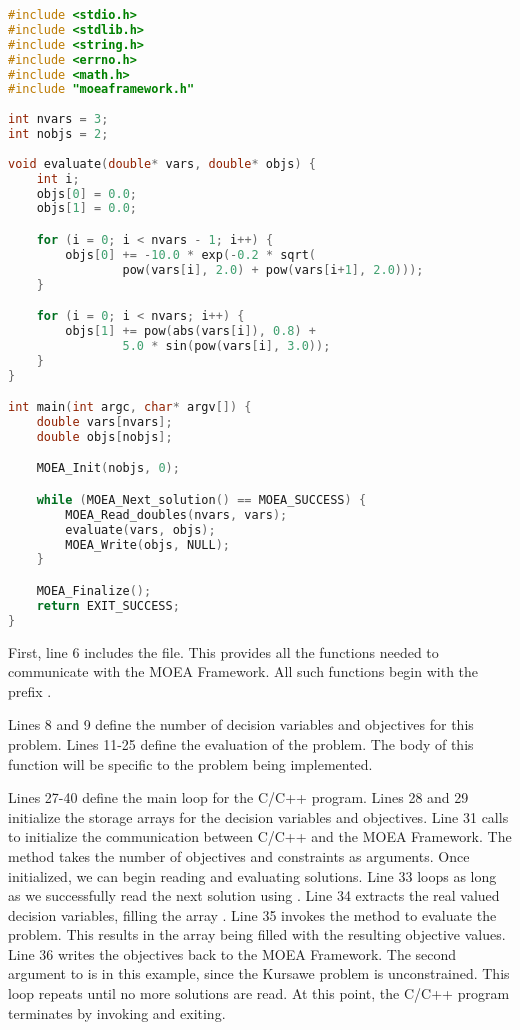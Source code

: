 \begin{lstlisting}[language=C]
#include <stdio.h>
#include <stdlib.h>
#include <string.h>
#include <errno.h>
#include <math.h>
#include "moeaframework.h"
 
int nvars = 3;
int nobjs = 2;
 
void evaluate(double* vars, double* objs) {
	int i;
	objs[0] = 0.0;
	objs[1] = 0.0;

	for (i = 0; i < nvars - 1; i++) {
		objs[0] += -10.0 * exp(-0.2 * sqrt(
				pow(vars[i], 2.0) + pow(vars[i+1], 2.0)));
	}

	for (i = 0; i < nvars; i++) {
		objs[1] += pow(abs(vars[i]), 0.8) +  
				5.0 * sin(pow(vars[i], 3.0));
	}
}

int main(int argc, char* argv[]) {
	double vars[nvars];
	double objs[nobjs];

	MOEA_Init(nobjs, 0);

	while (MOEA_Next_solution() == MOEA_SUCCESS) {
		MOEA_Read_doubles(nvars, vars);
		evaluate(vars, objs);
		MOEA_Write(objs, NULL);
	}

	MOEA_Finalize();
	return EXIT_SUCCESS;
}
\end{lstlisting}

First, line 6 includes the  file.  This provides all the functions needed to communicate with the MOEA Framework.  All such functions begin with the prefix .

Lines 8 and 9 define the number of decision variables and objectives for this problem.  Lines 11-25 define the evaluation of the problem.  The body of this function will be specific to the problem being implemented.

Lines 27-40 define the main loop for the C/C++ program.  Lines 28 and 29 initialize the storage arrays for the decision variables and objectives.  Line 31 calls  to initialize the communication between C/C++ and the MOEA Framework.  The  method takes the number of objectives and constraints as arguments.  Once initialized, we can begin reading and evaluating solutions.  Line 33 loops as long as we successfully read the next solution using .  Line 34 extracts the real valued decision variables, filling the array .  Line 35 invokes the  method to evaluate the problem.  This results in the array  being filled with the resulting objective values.  Line 36 writes the objectives back to the MOEA Framework.  The second argument to  is  in this example, since the Kursawe problem is unconstrained.  This loop repeats until no more solutions are read.  At this point, the C/C++ program terminates by invoking  and exiting.

